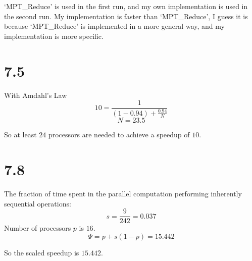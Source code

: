 `MPT\_Reduce' is used in the first run, and my own implementation is used in the second run. My implementation is faster than `MPT\_Reduce', I guess it is because `MPT\_Reduce' is implemented in a more general way, and my implementation is more specific.

\section*{7.5}

With Amdahl's Law
$$
10 = \frac{1}{(1 - 0.94) + \frac{0.94}{N}}
$$
$$
N=23.5
$$

So at least $24$ processors are needed to achieve a speedup of $10$.

\section*{7.8}

The fraction of time spent in the parallel computation performing inherently sequential operations:
$$
s = \frac{9}{242} = 0.037
$$
Number of processors $p$ is $16$.
$$
\varPsi = p + s(1 - p) = 15.442
$$

So the scaled speedup is $15.442$.